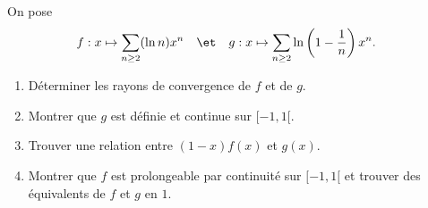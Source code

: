 \begin{enonce}
\begin{exercise}[ID={RMS124 E943 Centrale PSI},subtitle={},tags={}]
On pose
\begin{align*}
f&: x\mapsto \sum_{n\geq 2} (\ln n)x^n&
&\et&
g&:x\mapsto \sum_{n\geq 2}\ln\left( 1-\frac1n \right)x^n.
\end{align*}
\begin{enumerate}
  \item Déterminer les rayons de convergence de $f$ et de $g$.
  \item Montrer que $g$ est définie et continue sur $[-1,1[$.
  \item Trouver une relation entre $(1-x)f(x)$ et $g(x)$.
  \item Montrer que $f$ est prolongeable par continuité sur $[-1,1[$
    et trouver des équivalents de $f$ et $g$ en $1$.
\end{enumerate}
\end{exercise}
\begin{solution}
\end{solution}
\end{enonce}
